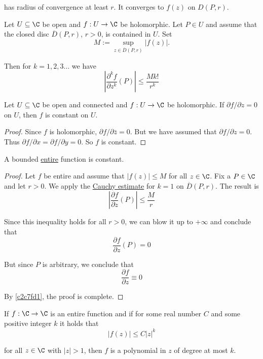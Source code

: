 has radius of convergence at least $r$. It converges to $f(z)$ on $D(P,r)$.

\label{a2d8611}

Let $U\subseteq\C$ be open and $f:U\to\C$ be holomorphic. Let $P\in U$ and
assume that the closed disc $\overline D(P,r)$, $r>0$, is contained in $U$. Set
$$
  M:=\sup_{z\in\overline D(P,r)}|f(z)|.
$$

Then for $k=1,2,3\ldots$ we have
$$
  \left|\frac{\partial^kf}{\partial z^k}(P)\right|\leq\frac{Mk!}{r^k}
$$

\Lemma{}\label{c2c7fd1}

Let $U\subseteq\C$ be open and connected and $f:U\to\C$ be holomorphic. If
$\partial f/\partial z=0$ on $U$, then $f$ is constant on $U$.

\begin{proof}
  Since $f$ is holomorphic, $\partial f/\partial\bar z=0$. But we have assumed
  that $\partial f/\partial z=0$. Thus $\partial f/\partial x=\partial f/\partial
  y=0$. So $f$ is constant.
\end{proof}

\label{cf6d8a9}

A bounded \href{d508dc8}{entire} function is constant.

\begin{proof}
  Let $f$ be entire and assume that $|f(z)|\leq M$ for all $z\in\C$. Fix a
  $P\in\C$ and let $r>0$. We apply the \href{a2d8611}{Cauchy estimate} for $k=1$
  on $\overline D(P,r)$. The result is
  $$
    \left|\frac{\partial f}{\partial z}(P)\right|\leq\frac Mr
  $$

  Since this inequality holds for all $r>0$, we can blow it up to $+\infty$ and
  conclude that
  $$
    \frac{\partial f}{\partial z}(P)=0
  $$

  But since $P$ is arbitrary, we conclude that
  $$
    \frac{\partial f}{\partial z}\equiv0
  $$

  By \autoref{c2c7fd1}, the proof is complete.
\end{proof}

\Theorem{}\label{db4ce28}

If $f:\C\to\C$ is an entire function and if for some real number $C$ and some
positive integer $k$ it holds that
$$
  |f(z)|\leq C|z|^k
$$

for all $z\in\C$ with $|z|>1$, then $f$ is a polynomial in $z$ of degree at
most $k$.

\Theorem{}\label{ae3b10d}

